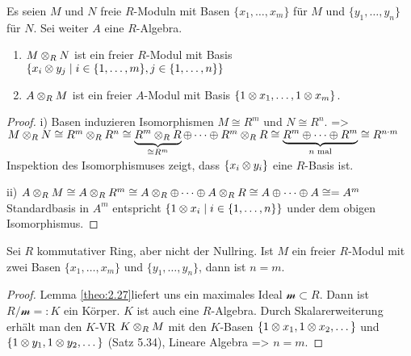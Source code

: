\documentclass[../main.tex]{subfiles}
\begin{document}
\begin{theorem}
    Es seien $M$ und $N$ freie $R$-Moduln mit Basen $\{x_1,\dots,x_m\}$ für $M$ und $\{y_1,\dots,y_n\}$ für $N$. Sei weiter $A$ eine $R$-Algebra.
    \begin{enumerate}[label=(\roman*)]
        \item $M\otimes_R N$ ist ein freier $R$-Modul mit Basis $\{x_i\otimes y_j\mid i \in \{1,\dots,m\}, j\in \{1,\dots,n\}\}$
        \item $A\otimes_R M$ ist ein freier $A$-Modul mit Basis $\{1\otimes x_1,\dots,1\otimes x_m\}$.
    \end{enumerate}
\end{theorem}
\begin{proof}
i)
    Basen induzieren Isomorphismen $M\cong R^m$ und $N\cong R^n$.
    => $M\otimes_R N\cong R^m \otimes_R R^n \cong \underbrace{R^m \otimes_R R}_{\cong R^m} \oplus \dots \oplus R^m \otimes_R R \cong \underbrace{R^m\oplus\dots\oplus R^m}_{n\text{ mal}} \cong R^{n\cdot m}$
    Inspektion des Isomorphismuses zeigt, dass $\{x_i\otimes y_i\}$ eine $R$-Basis ist.

    ii)
    $A \otimes_R M \cong A \otimes_R R^m \cong A\otimes_R\oplus \dots \oplus A \otimes_R R \cong A\oplus \dots \oplus A \cong = A^m$
    Standardbasis in $A^m$ entspricht $\{1\otimes x_i\mid i\in \{1,\dots, n\}\}$ under dem obigen Isomorphismus.
\end{proof}

\begin{corollary}
    Sei $R$ kommutativer Ring, aber nicht der Nullring. Ist $M$ ein freier $R$-Modul mit zwei Basen $\{x_1,\dots,x_m\}$ und $\{y_1,\dots,y_n\}$, dann ist $n=m$.
\end{corollary}
\begin{proof}
    Lemma \ref{theo:2.27} liefert uns ein maximales Ideal $\mathcal{m}\subset R$.
    Dann ist $R/\mathcal{m} =: K$ ein Körper. $K$ ist auch eine $R$-Algebra.
    Durch Skalarerweiterung erhält man den $K$-VR $K\otimes_R M$ mit den $K$-Basen $\{1\otimes x_1, 1\otimes x_2,\dots\}$ und $\{1\otimes y_1, 1\otimes y_2,\dots\}$ (Satz 5.34),
    Lineare Algebra => $n=m$.
\end{proof}
\end{document}
